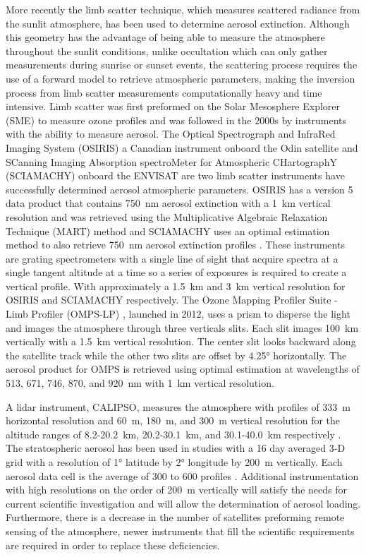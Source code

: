 \documentclass[12pt]{article}
\begin{document}
More recently the limb scatter technique, which measures scattered radiance from the sunlit atmosphere, has been used to determine aerosol extinction. Although this geometry has 
the advantage of being able to measure the atmosphere throughout the sunlit conditions, unlike occultation which can only gather measurements during sunrise or sunset events, 
the scattering process requires the use of a forward model to retrieve atmospheric parameters, making the inversion process from limb scatter measurements computationally heavy 
and time intensive. Limb scatter was first preformed on the Solar Mesosphere Explorer (SME) \citep{Barth1983} to measure ozone profiles and was followed in the 2000s by 
instruments with the ability to measure aerosol. The Optical Spectrograph and InfraRed Imaging System (OSIRIS) a Canadian instrument onboard the Odin satellite 
\citep{Llewellyn2004} and SCanning Imaging Absorption spectroMeter for Atmospheric CHartographY (SCIAMACHY) onboard the ENVISAT \citep{Bovensmann1999} are two limb scatter 
instruments have successfully determined aerosol atmospheric parameters. OSIRIS has a version 5 data product that contains 750~nm aerosol extinction with a 1~km vertical 
resolution \citep{Bourassa2012a} and was retrieved using the Multiplicative Algebraic Relaxation Technique (MART) method \citep{Degenstein2009} and SCIAMACHY uses an optimal 
estimation method to also retrieve 750~nm aerosol extinction profiles \citep{Ernst2012}. These instruments are grating spectrometers with a single line of sight that acquire 
spectra at a single tangent altitude at a time so a series of exposures is required to create a vertical profile. With approximately a 1.5~km and 3~km vertical resolution for 
OSIRIS and SCIAMACHY respectively. The Ozone Mapping Profiler Suite - Limb Profiler (OMPS-LP) \citep{Rault2013}, launched in 2012, uses a prism to disperse the light and images 
the atmosphere through three verticals slits. Each slit images 100~km vertically with a 1.5~km vertical resolution. The center slit looks backward along the satellite track 
while the other two slits are offset by 4.25\si{\degree} horizontally. The aerosol product for OMPS is retrieved using optimal estimation at wavelengths of 513, 671, 746, 870, 
and 920~nm with 1~km vertical resolution.

A lidar instrument, CALIPSO, measures the atmosphere with profiles of 333~m horizontal resolution and 60~m, 180~m, and 300~m vertical resolution for the altitude ranges of 
8.2-20.2~km, 20.2-30.1~km, and 30.1-40.0~km respectively \citep{Winker2003}. The stratospheric aerosol has been used in studies with a 16 day averaged 3-D grid with a resolution 
of 1\si{\degree} latitude by 2\si{\degree} longitude by 200~m vertically. Each aerosol data cell is the average of 300 to 600 profiles \citep{Vernier2009}. Additional 
instrumentation with high resolutions on the order of 200~m vertically will satisfy the needs for current scientific investigation and will allow the determination of aerosol 
loading. Furthermore, there is a decrease in the number of satellites preforming remote sensing of the atmosphere, newer instruments that fill the scientific requirements are 
required in order to replace these deficiencies. 
\end{document}
